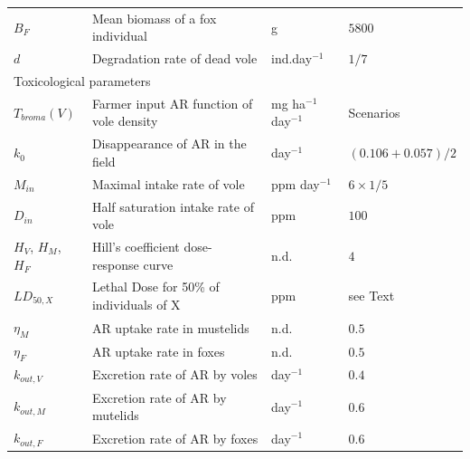 \documentclass[11pt]{article}
\begin{document}
\begin{table}
\begin{tabular}{l p{7cm} l p{3cm}}
$B_F$ & Mean biomass of a fox individual & g & $5800$ \\
%
$d$ & Degradation rate of dead vole & ind.day$^{-1}$ & $1/7$ \\
%
\hline
\multicolumn{2}{l}{Toxicological parameters}  & & \\
\hline
%
$T_{broma}(V)$ & Farmer input AR function of vole density & mg ha$^{-1}$ day$^{-1}$ & Scenarios \\
$k_0$ & Disappearance of AR in the field & day$^{-1}$ & $(0.106+0.057)/2$ \\
%
%
$M_{in}$ & Maximal intake rate of vole & ppm day$^{-1}$ & $6\times 1/5$ \\
%
$D_{in}$ & Half saturation intake rate of vole & ppm & $100$\\
%
$H_V$, $H_M$, $H_F$ & Hill's coefficient dose-response curve &  n.d. & $4$ \\
%
$LD_{50,X}$ & Lethal Dose for 50\% of individuals of X & ppm & see Text \\
%
%
$\eta_M$ & AR uptake rate in mustelids & n.d. & $0.5$ \\
$\eta_F$ & AR uptake rate in foxes & n.d.& $0.5$\\
%
$k_{out,V}$ & Excretion rate of AR by voles & day$^{-1}$ & $0.4$\\
$k_{out,M}$ & Excretion rate of AR by mutelids & day$^{-1}$ & $0.6$\\
$k_{out,F}$ & Excretion rate of AR by foxes & day$^{-1}$ & $0.6$\\
%
\hline
\end{tabular}
\end{table}



\end{document}
